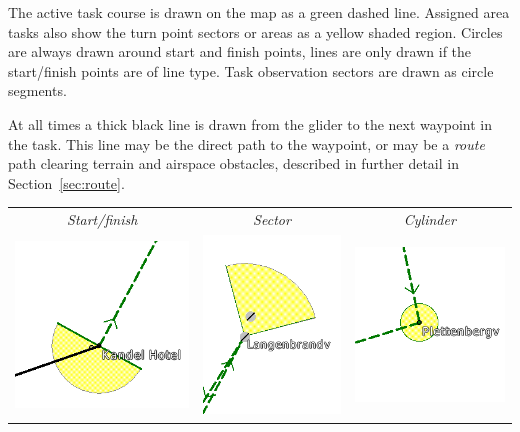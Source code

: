 The active task course is drawn on the map as a green dashed line.
Assigned area tasks also show the turn point sectors or areas as a yellow shaded
region.  
Circles are always drawn around start and finish points, lines are
only drawn if the start/finish points are of line type.  Task
observation sectors are drawn as circle segments.

At all times a thick black line is drawn from the glider to the next
waypoint in the task.  This line may be the direct path to the waypoint,
or may be a {\em route} path clearing terrain and airspace obstacles, described in
further detail in Section~\ref{sec:route}.

\begin{center}

\begin{tabular}{c c c}
{\it Start/finish} & {\it Sector} & {\it Cylinder} \\
\includegraphics[angle=0,width=0.3\linewidth,keepaspectratio='true']{figures/cut-startfinish.png} &
\includegraphics[angle=0,width=0.3\linewidth,keepaspectratio='true']{figures/cut-sector.png} &
\includegraphics[angle=0,width=0.3\linewidth,keepaspectratio='true']{figures/cut-barrel.png} \\
\end{tabular}
\end{center}

